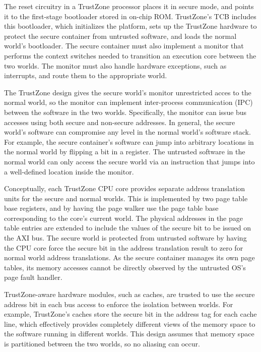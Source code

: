 The reset circuitry in a TrustZone processor places it in secure mode, and
points it to the first-stage bootloader stored in on-chip ROM. TrustZone's TCB
includes this bootloader, which initializes the platform, sets up the TrustZone
hardware to protect the secure container from untrusted software, and loads the
normal world's bootloader. The secure container must also implement a monitor
that performs the context switches needed to transition an execution core
between the two worlds. The monitor must also handle hardware exceptions, such
as interrupts, and route them to the appropriate world.

The TrustZone design gives the secure world's monitor unrestricted acces to the
normal world, so the monitor can implement inter-process communication (IPC)
between the software in the two worlds. Specifically, the monitor can issue
bus accesses using both secure and non-secure addresses. In general, the secure
world's software can compromise any level in the normal world's software stack.
For example, the secure container's software can jump into arbitrary locations
in the normal world by flipping a bit in a register. The untrusted software in
the normal world can only access the secure world via an instruction that jumps
into a well-defined location inside the monitor.

Conceptually, each TrustZone CPU core provides separate address translation
units for the secure and normal worlds. This is implemented by two page table
base registers, and by having the page walker use the page table base
corresponding to the core's current world. The physical addresses in the page
table entries are extended to include the values of the secure bit to be issued
on the AXI bus. The secure world is protected from untrusted software by having
the CPU core force the secure bit in the address translation result to zero for
normal world address translations. As the secure container manages its own page
tables, its memory accesses cannot be directly observed by the untrusted OS's
page fault handler.

TrustZone-aware hardware modules, such as caches, are trusted to use the secure
address bit in each bus access to enforce the isolation between worlds. For
example, TrustZone's caches store the secure bit in the address tag for each
cache line, which effectively provides completely different views of the memory
space to the software running in different worlds. This design assumes that
memory space is partitioned between the two worlds, so no aliasing can occur.

